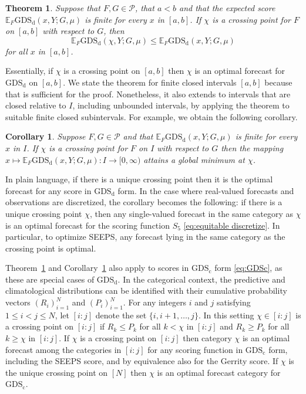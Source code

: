 \documentclass[10pt]{article} %
\theoremstyle{theorem}
\newtheorem{thm}{Theorem}
\newtheorem{cor}{Corollary}
\theoremstyle{definition}
\newcommand{\EEE}{\mathbb{E}}
\newcommand{\GDSd}{\mathrm{GDS}_\mathrm{d}}
\newcommand{\GDSc}{\mathrm{GDS}_\mathrm{c}}
\begin{document}
\begin{thm}\label{thm:optimal}
Suppose that $F,G\in\mathcal{P}$, that $a<b$ and that the expected score $\EEE_F \GDSd(x,Y;G,\mu)$ is finite for every $x$ in $[a,b]$. If $\chi$ is a crossing point for $F$ on $[a,b]$ with respect to $G$, then
\begin{equation}\label{eq:optimal expectation}
\EEE_F \GDSd(\chi,Y;G,\mu) \leq \EEE_F \GDSd(x,Y;G,\mu)
\end{equation}
for all $x$ in $[a,b]$.
\end{thm}

Essentially, if $\chi$ is a crossing point on $[a,b]$ then $\chi$ is an optimal forecast for $\GDSd$ on $[a,b]$. We state the theorem for finite closed intervals $[a,b]$ because that is sufficient for the proof. Nonetheless, it also extends to intervals that are closed relative to $I$, including unbounded intervals, by applying the theorem to suitable finite closed subintervals. For example, we obtain the following corollary.

\begin{cor}\label{cor:crossing point}
Suppose $F,G\in\mathcal{P}$ and that $\EEE_F \GDSd(x,Y;G,\mu)$ is finite for every $x$ in $I$. If $\chi$ is a crossing point for $F$ on $I$ with respect to $G$ then the mapping $x\mapsto\EEE_F \GDSd(x,Y;G,\mu):I\to[0,\infty)$ attains a global minimum at $\chi$.
\end{cor}

In plain language, if there is a unique crossing point then it is the optimal forecast for any score in $\GDSd$ form. In the case where real-valued forecasts and observations are discretized, the corollary becomes the following: if there is a unique crossing point $\chi$, then any single-valued forecast in the same category as $\chi$ is an optimal forecast for the scoring function $S_5$ \eqref{eq:equitable discretize}. In particular, to optimize SEEPS, any forecast lying in the same category as the crossing point is optimal.

Theorem~\ref{thm:optimal} and Corollary~\ref{cor:crossing point} also apply to scores in $\GDSc$ form \eqref{eq:GDSc}, as these are special cases of $\GDSd$. In the categorical context, the predictive and climatological distributions can be identified with their cumulative probability vectors $(R_i)_{i=1}^N$ and $(P_i)_{i=1}^N$. For any integers $i$ and $j$ satisfying $1\leq i<j\leq N$, let $[i:j]$ denote the set $\{i,i+1,\dots,j\}$. In this setting $\chi\in[i:j]$ is a crossing point on $[i:j]$ if $R_k\leq P_k$ for all $k<\chi$ in $[i:j]$ and $R_k\geq P_k$ for all $k\geq \chi$ in $[i:j]$. If $\chi$ is a crossing point on $[i:j]$ then category $\chi$ is an optimal forecast among the categories in $[i:j]$ for any scoring function in $\GDSc$ form, including the SEEPS score, and by equivalence also for the Gerrity score. If $\chi$ is the unique crossing point on $[N]$ then $\chi$ is an optimal forecast category for $\GDSc$.
\end{document}
